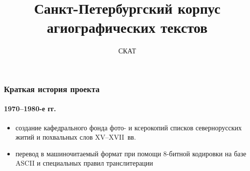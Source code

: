 \documentclass[xetex, aspectratio=169, russian]{beamer}
\title[СКАТ]{Санкт-Петербургский корпус агиографических текстов}
\subtitle{СКАТ}
\date{}
\begin{document}
\frame{\titlepage}

\begin{frame}
  \frametitle{Краткая история проекта}
  \framesubtitle{1970--1980-е гг.}

  \begin{block}{}
    \begin{itemize}
      \item создание кафедрального фонда фото- и ксерокопий списков севернорусских житий и похвальных слов XV--XVII~вв.\autocite{averina_alexeeva_gerd:1996}
      \item перевод в машиночитаемый формат при помощи 8-битной кодировки на базе ASCII и специальных правил транслитерации
    \end{itemize}
  \end{block}
\end{frame}
\end{document}
